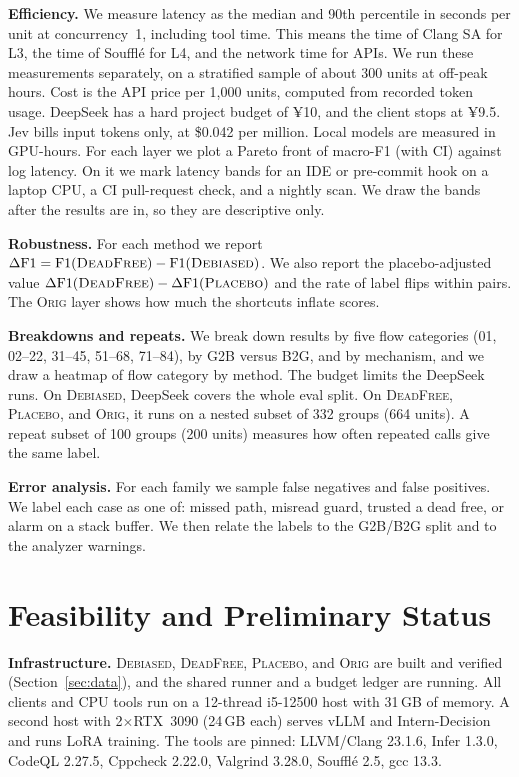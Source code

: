 \documentclass[conference]{IEEEtran}
\newcommand{\Orig}{\textsc{Orig}}
\newcommand{\Deb}{\textsc{Debiased}}
\newcommand{\Dead}{\textsc{DeadFree}}
\newcommand{\Plac}{\textsc{Placebo}}
\begin{document}
\textbf{Efficiency.}
We measure latency as the median and 90th percentile in seconds per unit at concurrency~1, including tool time.
This means the time of Clang SA for L3, the time of Soufflé for L4, and the network time for APIs.
We run these measurements separately, on a stratified sample of about 300 units at off-peak hours. %
Cost is the API price per 1,000 units, computed from recorded token usage.
DeepSeek has a hard project budget of ¥10, and the client stops at ¥9.5. %
Jev bills input tokens only, at \$0.042 per million. %
Local models are measured in GPU-hours.
For each layer we plot a Pareto front of macro-F1 (with CI) against log latency.
On it we mark latency bands for an IDE or pre-commit hook on a laptop CPU, a CI pull-request check, and a nightly scan.
We draw the bands after the results are in, so they are descriptive only.

\textbf{Robustness.}
For each method we report $\Delta\text{F1}=\text{F1}(\Dead)-\text{F1}(\Deb)$.
We also report the placebo-adjusted value $\Delta\text{F1}(\Dead)-\Delta\text{F1}(\Plac)$ and the rate of label flips within pairs.
The \Orig{} layer shows how much the shortcuts inflate scores.

\textbf{Breakdowns and repeats.}
We break down results by five flow categories (01, 02--22, 31--45, 51--68, 71--84), by G2B versus B2G, and by mechanism, and we draw a heatmap of flow category by method. %
The budget limits the DeepSeek runs.
On \Deb{}, DeepSeek covers the whole eval split. On \Dead{}, \Plac{}, and \Orig{}, it runs on a nested subset of 332 groups (664 units). %
A repeat subset of 100 groups (200 units) measures how often repeated calls give the same label. %

\textbf{Error analysis.}
For each family we sample false negatives and false positives.
We label each case as one of: missed path, misread guard, trusted a dead free, or alarm on a stack buffer.
We then relate the labels to the G2B/B2G split and to the analyzer warnings.

\section{Feasibility and Preliminary Status}
\label{sec:feasibility}
\textbf{Infrastructure.}
\Deb{}, \Dead{}, \Plac{}, and \Orig{} are built and verified (Section~\ref{sec:data}), and the shared runner and a budget ledger are running.
All clients and CPU tools run on a 12-thread i5-12500 host with 31\,GB of memory. %
A second host with 2$\times$RTX~3090 (24\,GB each) serves vLLM and Intern-Decision and runs LoRA training. %
The tools are pinned: LLVM/Clang 23.1.6, Infer 1.3.0, CodeQL 2.27.5, Cppcheck 2.22.0, Valgrind 3.28.0, Soufflé 2.5, gcc 13.3. %
\end{document}
